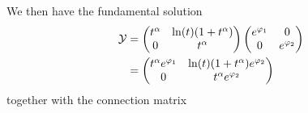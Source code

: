We then have the fundamental solution
\begin{align*}
  \mathcal{Y}&=\begin{pmatrix}
    t^\alpha & \ln(t)(1+t^\alpha) \\ 0 & t^\alpha
  \end{pmatrix}
  \begin{pmatrix}
    e^{\varphi_1} & 0 \\ 0 & e^{\varphi_2}
  \end{pmatrix}
  \\&=
  \begin{pmatrix}
    t^\alpha e^{\varphi_1} & \ln(t)(1+t^\alpha)e^{\varphi_2}
    \\0 & t^\alpha e^{\varphi_2}
  \end{pmatrix}
\end{align*}
together with the connection matrix
